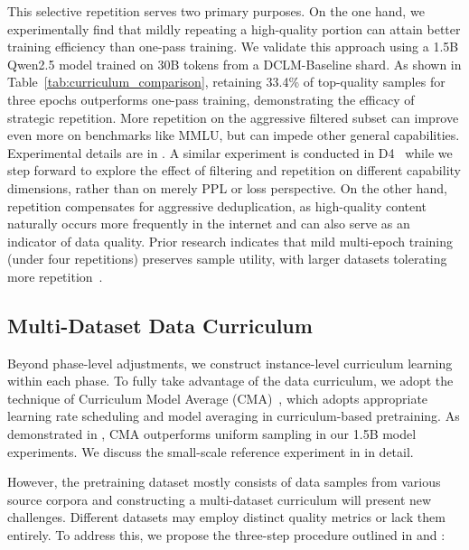 This selective repetition serves two primary purposes. On the one hand, we experimentally find that mildly repeating a high-quality portion can attain better training efficiency than one-pass training. We validate this approach using a 1.5B Qwen2.5 model trained on 30B tokens from a DCLM-Baseline shard. As shown in Table~\ref{tab:curriculum_comparison}, retaining 33.4\% of top-quality samples for three epochs outperforms one-pass training, demonstrating the efficacy of strategic repetition. More repetition on the aggressive filtered subset can improve even more on benchmarks like MMLU, but can impede other general capabilities. Experimental details are in . A similar experiment is conducted in D4~\citep{tirumala2025d4} while we step forward to explore the effect of filtering and repetition on different capability dimensions, rather than on merely PPL or loss perspective. On the other hand, repetition compensates for aggressive deduplication, as high-quality content naturally occurs more frequently in the internet and can also serve as an indicator of data quality. Prior research indicates that mild multi-epoch training (under four repetitions) preserves sample utility, with larger datasets tolerating more repetition~\citep{yan2025largerdatasetsrepeatedmore,muennighoff2023data_constrained}.

\subsection{Multi-Dataset Data Curriculum}\label{sec:multi_dataset_curriculum_subsec}

Beyond phase-level adjustments, we construct instance-level curriculum learning within each phase. To fully take advantage of the data curriculum, we adopt the technique of Curriculum Model Average (CMA)~\citep{luo2025learningratedecaywastes}, which adopts appropriate learning rate scheduling and model averaging in curriculum-based pretraining. As demonstrated in , CMA outperforms uniform sampling in our 1.5B model experiments. We discuss the small-scale reference experiment in  in detail.

However, the pretraining dataset mostly consists of data samples from various source corpora and constructing a multi-dataset curriculum will present new challenges. Different datasets may employ distinct quality metrics or lack them entirely. To address this, we propose the three-step procedure outlined in  and :

